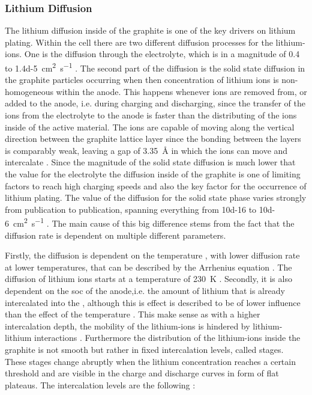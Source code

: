 \subsubsection{Lithium Diffusion}
The lithium diffusion inside of the graphite is one of the key drivers on lithium plating. Within the cell there are two different diffusion processes for the lithium-ions. One is the diffusion through the electrolyte, which is in a magnitude of 0.4 to \SI{1.4d-5}{\square\centi\metre\per\second} \cite{Lee.2002}. The second part of the diffusion is the solid state diffusion in the graphite particles occurring when then concentration of lithium ions is non-homogeneous within the anode. This happens whenever ions are removed from, or added to the anode, i.e. during charging and discharging, since the transfer of the ions from the electrolyte to the anode is faster than the distributing of the ions inside of the active material. The ions are capable of moving along the vertical direction between the graphite lattice layer since the bonding between the layers is comparably weak, leaving a gap of \SI{3.35}{\angstrom} in which the ions can move and intercalate \cite{Li.2019}. Since the magnitude of the solid state diffusion is much lower that the value for the electrolyte \cite{Kulova.2006} the diffusion inside of the graphite is one of limiting factors to reach high charging speeds and also the key factor for the occurrence of lithium plating. The value of the  diffusion for the solid state phase varies strongly from publication to publication, spanning everything from \SI{10d-16}{} to \SI{10d-6}{\square\centi\metre\per\second} \cite{Kulova.2006,Persson.2010}. The main cause of this big difference stems from the fact that the diffusion rate is dependent on multiple different parameters. \par
Firstly, the diffusion is dependent on the temperature , with lower diffusion rate at lower temperatures, that can be described by the Arrhenius equation \cite{Kulova.2006}. The diffusion of lithium ions starts at a temperature of \SI{230}{\kelvin} \cite{Umegaki.2017}. Secondly, it is also dependent on the \gls{soc} of the anode,i.e. the amount of lithium that is already intercalated into the  \cite{Malifarge.2018}, although this is effect is described to be of lower influence than the effect of the temperature \cite{Yu.1999,Levi.1996}. This make sense as with a higher intercalation depth, the mobility of the lithium-ions is hindered by lithium-lithium interactions \cite{Persson.2010}. Furthermore the distribution of the lithium-ions inside the graphite is not smooth but rather in fixed intercalation levels, called stages. These stages change abruptly when the lithium concentration reaches a certain threshold and are visible in the charge and discharge curves in form of flat plateaus. The intercalation levels are the following \cite{Nowak.2014}:

